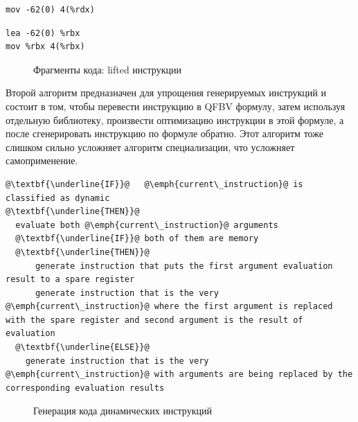 \newsavebox\boxfive
\begin{lrbox}{\boxfive}
\begin{lstlisting}[xleftmargin = 20pt]
mov -62(0) 4(%rdx)
\end{lstlisting}
\end{lrbox}

\newsavebox\boxsix
\begin{lrbox}{\boxsix}
\begin{lstlisting}[xleftmargin = 20pt]
lea -62(0) %rbx 
mov %rbx 4(%rbx)
\end{lstlisting}
\end{lrbox}

\begin{figure}[!t]
\subfloat[\label{fig:qfbv1}]{\usebox\boxfour}
\hfill
\subfloat[\label{fig:qfbv22}]{\usebox\boxfive}
\hfill
\subfloat[\label{fig:qfbv3}]{\usebox\boxsix}
\caption{Фрагменты кода: lifted инструкции}
\end{figure}

Второй алгоритм предназначен для упрощения генерируемых инструкций и состоит в том, чтобы перевести инструкцию в QFBV формулу, затем используя отдельную библиотеку, произвести оптимизацию инструкции в этой формуле, а после сгенерировать инструкцию по формуле обратно. Этот алгоритм тоже слишком сильно усложняет алгоритм специализации, что усложняет самоприменение.

\newsavebox\boxminustwo
\begin{lrbox}{\boxminustwo}
\begin{lstlisting}[xleftmargin = 20pt]
@\textbf{\underline{IF}}@   @\emph{current\_instruction}@ is classified as dynamic
@\textbf{\underline{THEN}}@
  evaluate both @\emph{current\_instruction}@ arguments
  @\textbf{\underline{IF}}@ both of them are memory
  @\textbf{\underline{THEN}}@
      generate instruction that puts the first argument evaluation result to a spare register
      generate instruction that is the very @\emph{current\_instruction}@ where the first argument is replaced with the spare register and second argument is the result of evaluation
  @\textbf{\underline{ELSE}}@
    generate instruction that is the very @\emph{current\_instruction}@ with arguments are being replaced by the corresponding evaluation results
\end{lstlisting}
\end{lrbox}
\begin{figure}[!t]
\centering
\subfloat{\usebox\boxminustwo}
\caption{Генерация кода динамических инструкций\label{fig:generate}}
\end{figure}

